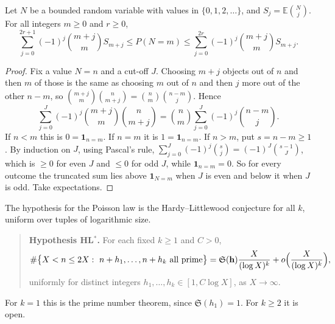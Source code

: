 \begin{lemma}\label{lem:binmoments}
Let $N$ be a bounded random variable with values in $\{0,1,2,\dots\}$, and $S_j=\mathbb E\binom Nj$. For all integers $m\ge0$ and $r\ge0$,
\[
\sum_{j=0}^{2r+1}(-1)^j\binom{m+j}mS_{m+j}\le P(N=m)\le\sum_{j=0}^{2r}(-1)^j\binom{m+j}mS_{m+j}.
\]
\end{lemma}
\begin{proof}
Fix a value $N=n$ and a cut-off $J$. Choosing $m+j$ objects out of $n$ and then $m$ of those is the same as choosing $m$ out of $n$ and then $j$ more out of the other $n-m$, so $\binom{m+j}m\binom n{m+j}=\binom nm\binom{n-m}j$. Hence
\[
\sum_{j=0}^J(-1)^j\binom{m+j}m\binom n{m+j}=\binom nm\sum_{j=0}^J(-1)^j\binom{n-m}j.
\]
If $n<m$ this is $0=\mathbf 1_{n=m}$. If $n=m$ it is $1=\mathbf 1_{n=m}$. If $n>m$, put $s=n-m\ge1$. By induction on $J$, using Pascal's rule, $\sum_{j=0}^J(-1)^j\binom sj=(-1)^J\binom{s-1}J$, which is $\ge0$ for even $J$ and $\le0$ for odd $J$, while $\mathbf 1_{n=m}=0$. So for every outcome the truncated sum lies above $\mathbf 1_{N=m}$ when $J$ is even and below it when $J$ is odd. Take expectations.
\end{proof}

The hypothesis for the Poisson law is the Hardy--Littlewood conjecture for all $k$, uniform over tuples of logarithmic size.

\begin{quote}
\textbf{Hypothesis HL$^*$.} For each fixed $k\ge1$ and $C>0$,
\[
\#\bigl\{X<n\le2X:\ n+h_1,\dots,n+h_k\text{ all prime}\bigr\}=\mathfrak S(\mathbf h)\frac X{(\log X)^k}+o\Bigl(\frac X{(\log X)^k}\Bigr),
\]
uniformly for distinct integers $h_1,\dots,h_k\in[1,C\log X]$, as $X\to\infty$.
\end{quote}

For $k=1$ this is the prime number theorem, since $\mathfrak S(h_1)=1$. For $k\ge2$ it is open.

